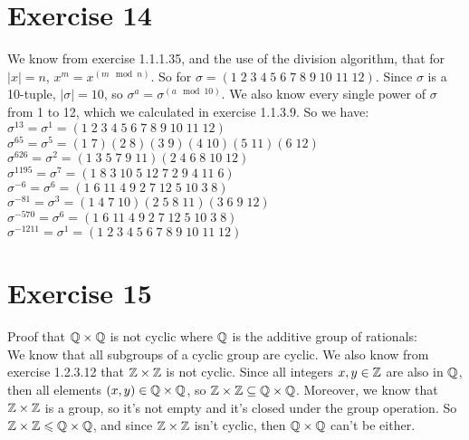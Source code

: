 \documentclass[12pt]{article}
\begin{document}
    \section*{Exercise 14}
    We know from exercise 1.1.1.35, and the use of the division
    algorithm, that for $|x| = n$, $x^m = x^{(m \mod n)}$.
    So for $\sigma = (1\;2\;3\;4\;5\;6\;7\;8\;9\;10\;11\;12)$.
    Since $\sigma$ is a 10-tuple, $|\sigma| = 10$,
    so $\sigma^a = \sigma^{(a \mod 10)}$.
    We also know every single power of $\sigma$ from 1 to 12,
    which we calculated in exercise 1.1.3.9.
    So we have: \\
    $\sigma^{13} = \sigma^1 = (1\;2\;3\;4\;5\;6\;7\;8\;9\;10\;11\;12)$ \\
    $\sigma^{65} = \sigma^5 = (1\;7)(2\;8)(3\;9)(4\;10)(5\;11)(6\;12)$ \\
    $\sigma^{626} = \sigma^2 = (1\;3\;5\;7\;9\;11)(2\;4\;6\;8\;10\;12)$ \\
    $\sigma^{1195} = \sigma^7 = (1\;8\;3\;10\;5\;12\;7\;2\;9\;4\;11\;6)$ \\
    $\sigma^{-6} = \sigma^6 = (1\;6\;11\;4\;9\;2\;7\;12\;5\;10\;3\;8)$ \\
    $\sigma^{-81} = \sigma^3 = (1\;4\;7\;10)(2\;5\;8\;11)(3\;6\;9\;12)$ \\
    $\sigma^{-570} = \sigma^6 = (1\;6\;11\;4\;9\;2\;7\;12\;5\;10\;3\;8)$ \\
    $\sigma^{-1211} = \sigma^1 = (1\;2\;3\;4\;5\;6\;7\;8\;9\;10\;11\;12)$


    \section*{Exercise 15}
    Proof that $\mathbb{Q} \times \mathbb{Q}$ is not cyclic
    where $\mathbb{Q}$ is the additive group of rationals: \\
    We know that all subgroups of a cyclic group are cyclic.
    We also know from exercise 1.2.3.12 that $\mathbb{Z} \times \mathbb{Z}$
    is not cyclic.
    Since all integers $x, y \in \mathbb{Z}$ are also in $\mathbb{Q}$,
    then all elements $(x, y) \in \mathbb{Q} \times \mathbb{Q}$,
    so $\mathbb{Z} \times \mathbb{Z} \subseteq \mathbb{Q} \times \mathbb{Q}$.
    Moreover, we know that $\mathbb{Z} \times \mathbb{Z}$ is a group,
    so it's not empty and it's closed under the group operation.
    So $\mathbb{Z} \times \mathbb{Z} \leqslant \mathbb{Q} \times \mathbb{Q}$,
    and since $\mathbb{Z} \times \mathbb{Z}$ isn't cyclic,
    then $\mathbb{Q} \times \mathbb{Q}$ can't be either.
\end{document}
